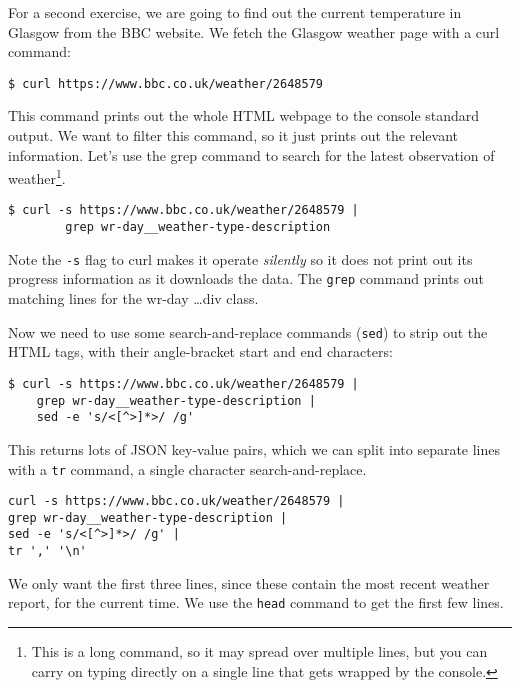 \documentclass{article}
\begin{document}
For a second exercise, we are going to find out the current temperature in Glasgow from the BBC website.
We fetch the Glasgow weather page with a curl command:

\begin{lstlisting}[style=BashInputStyle]
    $ curl https://www.bbc.co.uk/weather/2648579
\end{lstlisting}

This command prints out the whole HTML webpage to the console standard output. We want to filter this command, so it just prints out the relevant information. Let's use the grep command to search for the latest observation of weather\footnote{This is a long command, so it may spread over multiple lines, but you can carry on typing directly on a single line that gets wrapped by the console.}.

\begin{lstlisting}[style=BashInputStyle]
    $ curl -s https://www.bbc.co.uk/weather/2648579 | 
        grep wr-day__weather-type-description 
\end{lstlisting}

Note the \texttt{-s} flag to curl makes it operate \textit{silently} so it does not print out its progress information as it downloads the data. The \texttt{grep} command prints out matching lines for the wr-day \ldots div class.

Now we need to use some search-and-replace commands (\texttt{sed}) to strip out the HTML tags, with their angle-bracket start and end characters:

\begin{lstlisting}[style=BashInputStyle]
    $ curl -s https://www.bbc.co.uk/weather/2648579 | 
    grep wr-day__weather-type-description |
    sed -e 's/<[^>]*>/ /g'
\end{lstlisting}


This returns lots of JSON key-value pairs, which we can split into separate lines with a \texttt{tr} command, a single character search-and-replace.

\begin{lstlisting}[style=BashInputStyle]
curl -s https://www.bbc.co.uk/weather/2648579 | 
grep wr-day__weather-type-description |  
sed -e 's/<[^>]*>/ /g' | 
tr ',' '\n'
\end{lstlisting}

We only want the first three lines, since these contain the most recent weather report, for the current time. We use the \texttt{head} command to get the first few lines.
\end{document}
